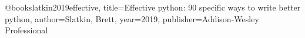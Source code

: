 @book{slatkin2019effective,
  title={Effective python: 90 specific ways to write better python},
  author={Slatkin, Brett},
  year={2019},
  publisher={Addison-Wesley Professional}
}
